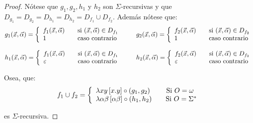 \begin{proof}
    \PN Nótese que $g_{1}, g_{2}, h_{1}$ y $h_{2}$ son $\Sigma$-recursivas y que $D_{g_{1}} = D_{g_{2}} = D_{h_{1}} =
    D_{h_{2}} = D_{f_{1}} \cup D_{f_{2}}$. Además nótese que:
    \[
      g_{1}(\vec{x},\vec{\alpha}) = \left\{
        \begin{array}{lll}
          f_{1}(\vec{x},\vec{\alpha}) & & \text{si } (\vec{x},\vec{\alpha})\in D_{f_{1}} \\
          1 & & \text{caso contrario}
        \end{array} \right.
      \\ \qquad
      g_{2}(\vec{x},\vec{\alpha}) = \left\{
        \begin{array}{lll}
          f_{2}(\vec{x},\vec{\alpha}) & & \text{si }(\vec{x},\vec{\alpha})\in D_{f_{2}} \\
          1 & & \text{caso contrario}
        \end{array} \right.
    \]

    \[
      h_{1}(\vec{x},\vec{\alpha}) = \left\{
        \begin{array}{lll}
          f_{1}(\vec{x},\vec{\alpha}) & & \text{si } (\vec{x},\vec{\alpha})\in D_{f_{1}} \\
          \varepsilon & & \text{caso contrario}
        \end{array} \right.
      \\ \qquad
      h_{2}(\vec{x},\vec{\alpha}) = \left\{
        \begin{array}{lll}
          f_{2}(\vec{x},\vec{\alpha}) & & \text{si }(\vec{x},\vec{\alpha})\in D_{f_{2}} \\
          \varepsilon & & \text{caso contrario}
        \end{array} \right.
    \]

    \PN Osea, que:
    \[
      f_{1} \cup f_{2} = \left\{
        \begin{array}{lll}
          \lambda xy \left[x.y\right] \circ (g_{1},g_{2}) \qquad\ \text{Si } O = \omega \\
          \lambda \alpha \beta \left[ \alpha \beta \right] \circ (h_{1},h_{2}) \qquad \text{Si } O = \SIGMA
        \end{array} \right.
    \]

    \PN es $\Sigma$-recursiva.
  \end{proof}


